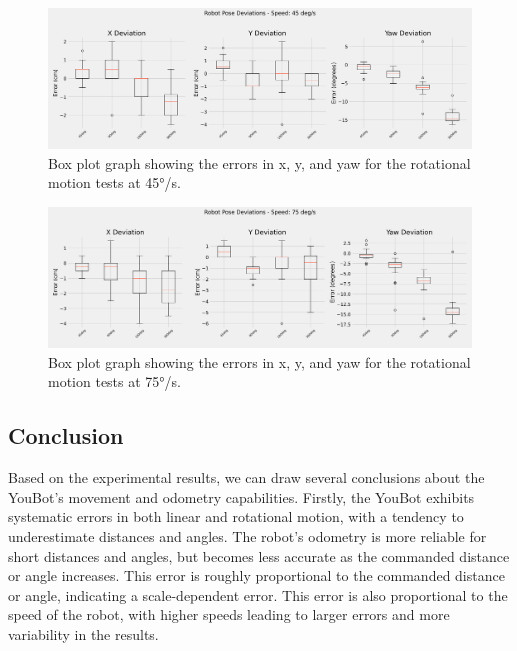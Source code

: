 \documentclass[a4paper, 12pt]{article}
\begin{document}
    
    \begin{figure}[H]
        \centering
        \includegraphics[width=0.99\linewidth]{images/experiment_results/rotational_errors_speed_45.png}
        \caption{Box plot graph showing the errors in x, y, and yaw for the rotational motion tests at 45°/s.}
    \end{figure}
    \begin{figure}[H]
        \centering
        \includegraphics[width=0.99\linewidth]{images/experiment_results/rotational_errors_speed_75.png}
        \caption{Box plot graph showing the errors in x, y, and yaw for the rotational motion tests at 75°/s.}
    \end{figure}

    
    \subsection{Conclusion}

    Based on the experimental results, we can draw several conclusions about the YouBot's movement and odometry capabilities. Firstly, the YouBot exhibits systematic errors in both linear and rotational motion, with a tendency to underestimate distances and angles. The robot's odometry is more reliable for short distances and angles, but becomes less accurate as the commanded distance or angle increases. This error is roughly proportional to the commanded distance or angle, indicating a scale-dependent error. This error is also proportional to the speed of the robot, with higher speeds leading to larger errors and more variability in the results.
    
\end{document}
